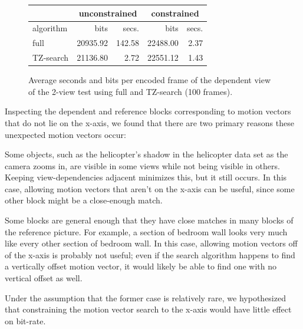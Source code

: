 \documentclass{sig-alternate-05-2015}
\begin{document}
\begin{figure}[h]
\centering\small
\begin{tabular}{|l|r|r|r|r|}
\multicolumn{1}{c}{} & \multicolumn{2}{c}{unconstrained} & \multicolumn{2}{c}{constrained} \\ \hline
algorithm            & bits            & secs.           & bits            & secs.         \\ \hline
full                 & 20935.92        & 142.58          & 22488.00        & 2.37          \\ \hline
TZ-search            & 21136.80        & 2.72            & 22551.12        & 1.43          \\ \hline
\end{tabular}
\caption{Average seconds and bits per encoded frame of the dependent view of the
2-view test using full and TZ-search (100 frames).}
\label{fig:time-full-fast}
\end{figure}

Inspecting the dependent and reference blocks corresponding to motion vectors
that do not lie on the x-axis, we found that there are two primary reasons these
unexpected motion vectors occur: \begin{compactitem}
\item Some objects, such as the helicopter's shadow in the helicopter data set
as the camera zooms in, are visible in some views while not being visible in
others. Keeping view-dependencies adjacent minimizes this, but it still occurs.
In this case, allowing motion vectors that aren't on the x-axis can be useful,
since some other block might be a close-enough match.
\item Some blocks are general enough that they have close matches in many blocks
of the reference picture. For example, a section of bedroom wall looks very much
like every other section of bedroom wall. In this case, allowing motion vectors
off of the x-axis is probably not useful; even if the search algorithm happens
to find a vertically offset motion vector, it would likely be able to find one
with no vertical offset as well. \end{compactitem} Under the assumption that the
former case is relatively rare, we hypothesized that constraining the motion
vector search to the x-axis would have little effect on bit-rate.
\end{document}
